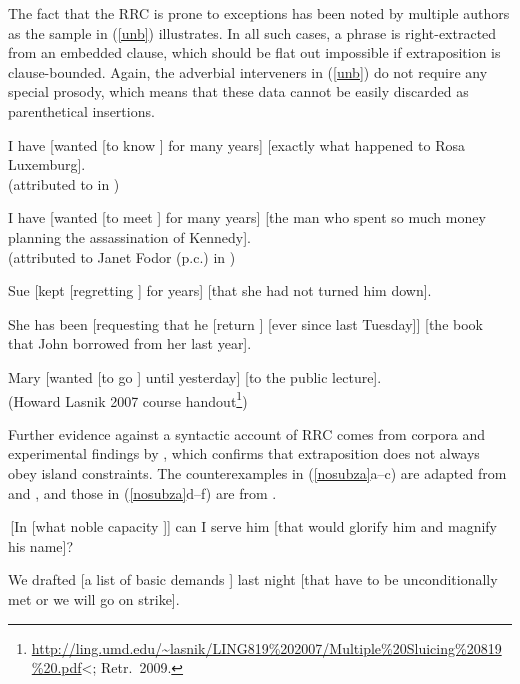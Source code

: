 \documentclass[output=paper]{langsci/langscibook}
\begin{document}
The fact that the RRC is prone to exceptions has been noted by multiple authors as the sample in 
 (\ref{unb}) illustrates. In all such cases, a phrase is right-extracted
 from an embedded clause, which should be flat out impossible if extraposition is clause-bounded. Again, the adverbial  interveners in (\ref{unb}) do not require any special prosody, which means that
  these data cannot be easily discarded as parenthetical insertions.
  
\ea \label{unb}
\ea  I have  [wanted [to know \spc] for many years] [exactly what happened to Rosa Luxemburg].\\
(attributed to \citet{
witten} in \citet[92n]{postal74})

\item I have  [wanted [to meet \spc] for many years] [the man who spent so much money planning the assassination of Kennedy].\\
(attributed to Janet Fodor (p.c.) in \citet[177]{gazdar})

\item Sue [kept [regretting \spc] for years] [that she had not turned
him down].\\
\citep{eynde96}

\item She has been [requesting that he [return \spc] [ever since last Tuesday]] [the book
that John borrowed from her last year].\\
\citep[251]{kayne00}

\item  Mary [wanted [to go \spc] until yesterday]  [to the public lecture].\\
(Howard Lasnik 2007 course handout\footnote{\url{http://ling.umd.edu/~lasnik/LING819\%202007/Multiple\%20Sluicing\%20819\%20.pdf}<; Retr.\ 2009.})
\z
\z


Further evidence against a syntactic account of RRC comes from  corpora and experimental findings by  \citet{strunk08,strunk}, which confirms that  extraposition does  not always obey  island constraints.  The counterexamples in (\ref{nosubza}a--c) are adapted from
 \citet{strunk08} and \citet{strunk}, and those in (\ref{nosubza}d--f) are from \citet[863]{chavesrnr}.


\ea 
\ea  \,[In [what noble capacity \spc]] can I serve him
[that would glorify him and magnify his name]?

\item  We drafted [a list of basic demands \spc] last night [that have
to be unconditionally met or we will  go on strike].
\end{document}
